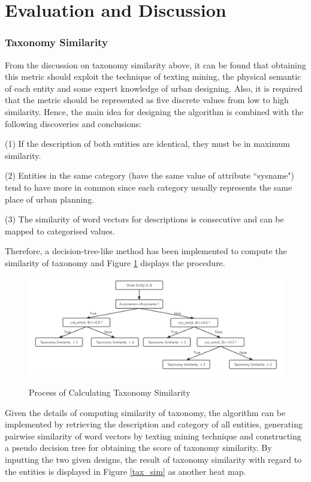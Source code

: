 \section*{Evaluation and Discussion}
\subsubsection*{Taxonomy Similarity}
From the discussion on taxonomy similarity above, it can be found that obtaining this metric should exploit the technique of texting mining, the physical semantic of each entity and some expert knowledge of urban designing. Also, it is required that the metric should be represented as five discrete values from low to high similarity. Hence, the main idea for designing the algorithm is combined with the following discoveries and conclusions:
\par
(1) If the description of both entities are identical, they must be in maximum similarity.
\par
(2) Entities in the same category (have the same value of attribute ``sysname") tend to have more in common since each category usually represents the same place of urban planning.
\par
(3) The similarity of word vectors for descriptions is consecutive and can be mapped to categorised values.
\par
Therefore, a decision-tree-like method has been implemented to compute the similarity of taxonomy and Figure \ref{eva_tax} displays the procedure.
\begin{figure}[H]
\caption{Process of Calculating Taxonomy Similarity}
\centering
\includegraphics[width=1.0\textwidth]{eva_tax.png}
\label{eva_tax}
\end{figure}
\par
Given the details of computing similarity of taxonomy, the algorithm can be implemented by retrieving the description and category of all entities, generating pairwise similarity of word vectors by texting mining technique and constructing a pseudo decision tree for obtaining the score of taxonomy similarity. By inputting the two given designs, the result of taxonomy similarity with regard to the entities is displayed in Figure \ref{tax_sim} as another heat map.
